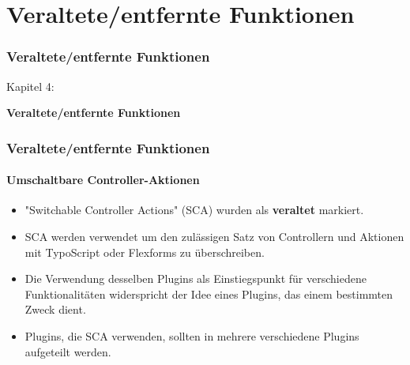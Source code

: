 %

\section{Veraltete/entfernte Funktionen}
\begin{frame}[fragile]
	\frametitle{Veraltete/entfernte Funktionen}

	\begin{center}\huge{Kapitel 4:}\end{center}
	\begin{center}\huge{\color{typo3darkgrey}\textbf{Veraltete/entfernte Funktionen}}\end{center}

\end{frame}


\begin{frame}[fragile]
	\frametitle{Veraltete/entfernte Funktionen}
	\framesubtitle{Umschaltbare Controller-Aktionen}

	\begin{itemize}
		\item "Switchable Controller Actions" (SCA) wurden als \textbf{veraltet} markiert.
		\item SCA werden verwendet um den zulässigen Satz von Controllern und Aktionen mit TypoScript oder Flexforms zu überschreiben.
		\item Die Verwendung desselben Plugins als Einstiegspunkt für verschiedene Funktionalitäten widerspricht der Idee eines Plugins, das einem bestimmten Zweck dient.
		\item Plugins, die SCA verwenden, sollten in mehrere verschiedene Plugins aufgeteilt werden.
	\end{itemize}

\end{frame}


